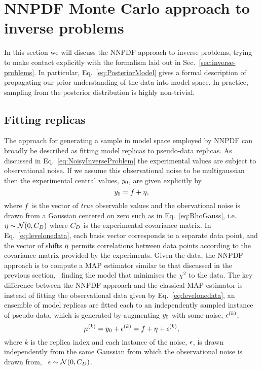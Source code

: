 \section{NNPDF Monte Carlo approach to inverse problems}
\label{sec:closure-test}

In this section we will discuss the NNPDF approach to inverse problems, trying
to make contact explicitly with the formalism laid out in
Sec.~\ref{sec:inverse-problems}. In particular, Eq.~\eqref{eq:PosteriorModel}
gives a formal description of propagating our prior understanding of the data
into model space. In practice, sampling from the posterior distribution is
highly non-trivial.

\subsection{Fitting replicas}
\label{sec:fit-reps}

The approach for generating a sample in model space employed by NNPDF can
broadly be described as fitting model replicas to pseudo-data replicas. As
discussed in Eq.~\eqref{eq:NoisyInverseProblem} the experimental values are
subject to observational noise. If we assume this observational noise to be
multigaussian then the experimental central values, $y_0$, are given
explicitly by
\begin{equation}
    \label{eq:levelonedata}
    y_0 = f + \eta,
\end{equation}
where $f$ is the vector of {\em true} observable values and the obervational
noise is drawn from a Gaussian centered on zero such as in Eq.~\ref{eq:RhoGauss},
i.e.$\eta \sim \mathcal{N}(0, C_{D})$ where $C_{D}$ is the
experimental covariance matrix. In
Eq.~\eqref{eq:levelonedata}, each basis vector corresponds to a separate data
point, and the vector of shifts $\eta$ permits correlations between data
points according to the covariance matrix provided by the experiments. Given the
data, the NNPDF approach is to compute a MAP estimator similar to that discussed
in the previous section, \ie\ finding the model that minimises the $\chi^2$ to the
data. The key difference between the NNPDF approach and the classical MAP estimator
is instead of fitting the observational data given by Eq.~\ref{eq:levelonedata},
an ensemble of model replicas are fitted each to an independently sampled
instance of pseudo-data, which is generated by augmenting $y_0$ with some
noise, $\epsilon^{(k)}$,
\begin{equation}
    \label{eq:leveltwodata1}
    \mu^{(k)} = y_0 + \epsilon^{(k)}
    = f + \eta + \epsilon^{(k)},
\end{equation}
where $k$ is the replica index and each instance of the noise, $\epsilon$, is drawn
independently from the same Gaussian from which the observational noise is
drawn from, \ie\ $\epsilon \sim \mathcal{N}(0, C_{D})$.

